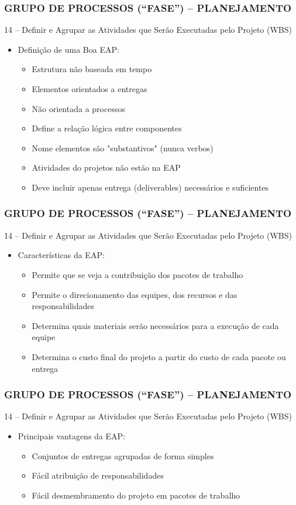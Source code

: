 \begin{frame}
 \frametitle{GRUPO DE PROCESSOS (“FASE”) – PLANEJAMENTO}
   14 – Definir e Agrupar as Atividades que Serão Executadas pelo Projeto (WBS)
  \begin{itemize}
   \item Definição de uma Boa EAP:
   \begin{itemize}
    \item Estrutura não baseada em tempo
    \item Elementos orientados a entregas
    \item Não orientada a processos
    \item Define a relação lógica entre componentes
    \item Nome elementos são "substantivos" (nunca verbos)
    \item Atividades do projetos não estão na EAP
    \item Deve incluir apenas entrega (deliverables) necessários e suficientes 
   \end{itemize}
  \end{itemize}
\end{frame}

\begin{frame}
 \frametitle{GRUPO DE PROCESSOS (“FASE”) – PLANEJAMENTO}
   14 – Definir e Agrupar as Atividades que Serão Executadas pelo Projeto (WBS)
  \begin{itemize}
   \item Características da EAP:
   \begin{itemize}
    \item Permite que se veja a contribuição dos pacotes de trabalho
    \item Permite o direcionamento das equipes, dos recursos e das responsabilidades
    \item Determina quais materiais serão necessários para a execução de cada equipe
    \item Determina o custo final do projeto a partir do custo de cada pacote ou entrega
   \end{itemize}
  \end{itemize}
\end{frame}

\begin{frame}
 \frametitle{GRUPO DE PROCESSOS (“FASE”) – PLANEJAMENTO}
   14 – Definir e Agrupar as Atividades que Serão Executadas pelo Projeto (WBS)
  \begin{itemize}
   \item Principais vantagens da EAP:
   \begin{itemize}
    \item Conjuntos de entregas agrupadas de forma simples
    \item Fácil atribuição de responsabilidades
    \item Fácil desmembramento do projeto em pacotes de trabalho
   \end{itemize}
  \end{itemize}
\end{frame}

